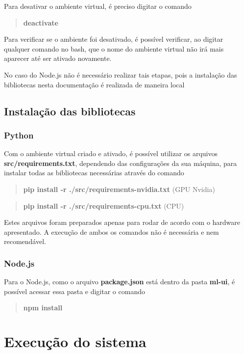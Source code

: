 \documentclass[Portugues,Final]{ic-tese-v3}
\begin{document}
Para desativar o ambiente virtual, é preciso digitar o comando

\begin{quote}\textbf{deactivate}\end{quote}

Para verificar se o ambiente foi desativado, é possível verificar, ao digitar qualquer comando no bash, que o nome do ambiente virtual não irá mais aparecer até ser ativado novamente.

No caso do Node.js não é necessário realizar tais etapas, pois a instalação das bibliotecas nesta documentação é realizada de maneira local

\subsection{Instalação das bibliotecas}

\subsubsection{Python}

Com o ambiente virtual criado e ativado, é possível utilizar os arquivos \textbf{src/requirements.txt}, dependendo das configurações da sua máquina, para instalar todas as bibliotecas necessárias através do comando

\begin{quote}\textbf{pip install -r ./src/requirements-nvidia.txt} (GPU Nvidia)\end{quote}
\begin{quote}\textbf{pip install -r ./src/requirements-cpu.txt} (CPU)\end{quote}

Estes arquivos foram preparados apenas para rodar de acordo com o hardware apresentado. A execução de ambos os comandos não é necessária e nem recomendável.

\subsubsection{Node.js}

Para o Node.js, como o arquivo \textbf{package.json} está dentro da pasta \textbf{ml-ui}, é possível acessar essa pasta e digitar o comando

\begin{quote}\textbf{npm install}\end{quote}

\section{Execução do sistema}
\end{document}
